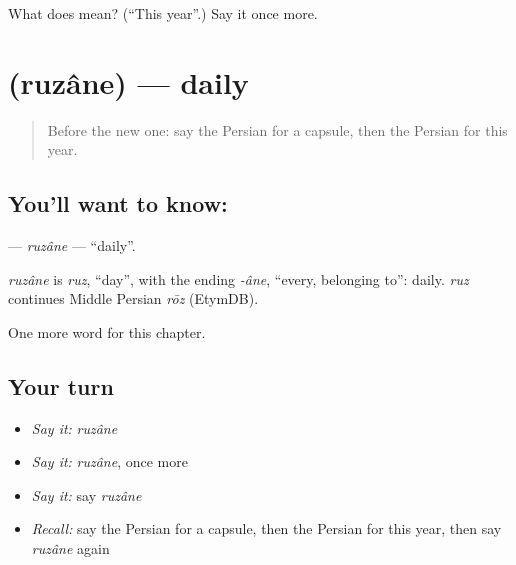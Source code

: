 \begin{tcolorbox}[breakable,colback=teal!4,colframe=teal!35!black,title={Before you move on}]
What does  mean? (\textquotedblleft{}This year\textquotedblright{}.) Say it once more.
\end{tcolorbox}
\section[\texorpdfstring{\fa{روزانه} (ruzâne)}{روزانه (ruzâne)}]{ (ruzâne) — daily}

\label{lesson:FA-C152-ruzane}



\begin{quote}
Before the new one: say the Persian for a capsule, then the Persian for this year.
\end{quote}

\subsection*{You'll want to know: }
\textbf{} — \emph{ruzâne} — \textquotedblleft{}daily\textquotedblright{}.

\begin{cousinweb}
\emph{ruzâne} is \emph{ruz}, \textquotedblleft{}day\textquotedblright{}, with the ending \emph{-âne}, \textquotedblleft{}every, belonging to\textquotedblright{}: daily. \emph{ruz} continues Middle Persian \emph{rōz} (EtymDB).
\end{cousinweb}

\begin{grammarlens}[title={What you've built}]
One more word for this chapter.
\end{grammarlens}

\subsection*{Your turn}
\begin{itemize}
\raggedright
  \item \emph{Say it:} \emph{ruzâne}
  \item \emph{Say it:} \emph{ruzâne}, once more
  \item \emph{Say it:} say \emph{ruzâne}
  \item \emph{Recall:} say the Persian for a capsule, then the Persian for this year, then say \emph{ruzâne} again
\end{itemize}

